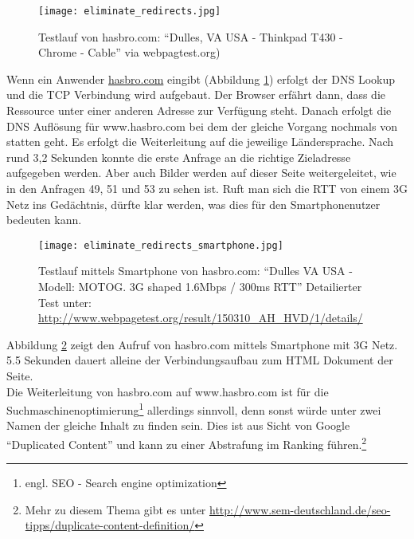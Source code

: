 \begin{itemize}
			\begin{figure}[htbp]
				\begin{center}
					\texttt{[image: eliminate\_redirects.jpg]}
					\caption{Testlauf von hasbro.com: "`Dulles, VA USA - Thinkpad T430 - Chrome - Cable"' via webpagtest.org)}
					\label{fig:eliminate_redirects}
				\end{center}
			\end{figure}
			
			Wenn ein Anwender \url{hasbro.com} eingibt (Abbildung \ref{fig:eliminate_redirects}) erfolgt der DNS Lookup und die TCP Verbindung wird aufgebaut. Der Browser erfährt dann, dass die Ressource unter einer anderen Adresse zur Verfügung steht. Danach erfolgt die DNS Auflösung für www.hasbro.com bei dem der gleiche Vorgang nochmals von statten geht. Es erfolgt die Weiterleitung auf die jeweilige Ländersprache. Nach rund 3,2 Sekunden konnte die erste Anfrage an die richtige Zieladresse aufgegeben werden. Aber auch Bilder werden auf dieser Seite weitergeleitet, wie in den Anfragen 49, 51 und 53 zu sehen ist. Ruft man sich die RTT von einem 3G Netz ins Gedächtnis, dürfte klar werden, was dies für den Smartphonenutzer bedeuten kann. \\

			\begin{figure}[htbp]
				\begin{center}
					\texttt{[image: eliminate\_redirects\_smartphone.jpg]}
					\caption{Testlauf mittels Smartphone von hasbro.com: "`Dulles VA USA - Modell: MOTOG. 3G shaped 1.6Mbps / 300ms RTT"' Detailierter Test unter: \url{http://www.webpagetest.org/result/150310_AH_HVD/1/details/}}
					\label{fig:eliminate_redirects_smartphone}
				\end{center}
			\end{figure}

			Abbildung \ref{fig:eliminate_redirects_smartphone} zeigt den Aufruf von hasbro.com mittels Smartphone mit 3G Netz. 5.5 Sekunden dauert alleine der Verbindungsaufbau zum HTML Dokument der Seite.\\

			Die Weiterleitung von hasbro.com auf www.hasbro.com ist für die Suchmaschinenoptimierung\footnote{engl. SEO - Search engine optimization} allerdings sinnvoll, denn sonst würde unter zwei Namen der gleiche Inhalt zu finden sein. Dies ist aus Sicht von Google "`Duplicated Content"' und kann zu einer Abstrafung im Ranking führen.\footnote{Mehr zu diesem Thema gibt es unter \url{http://www.sem-deutschland.de/seo-tipps/duplicate-content-definition/}}


\end{itemize}
